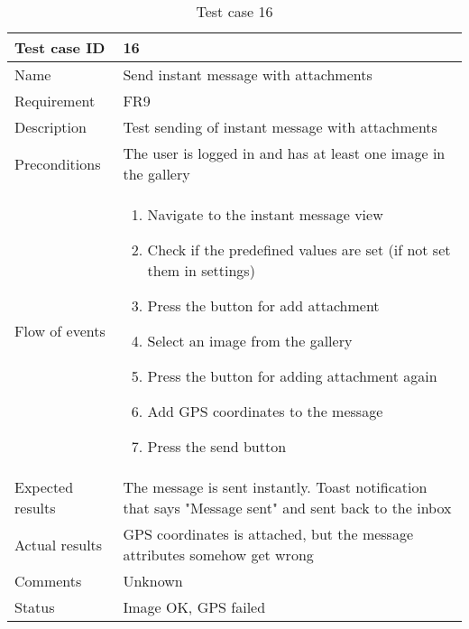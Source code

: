 		\begin{table}
			\begin{tabular}{l|p{10cm}}
				Test case ID & 16 \\ \hline
				Name & Send instant message with attachments\\ \hline
				Requirement & FR9\\ \hline
				Description & Test sending of instant message with attachments\\ \hline
				Preconditions & The user is logged in and has at least one image in the gallery\\ \hline
				Flow of events & 
					\begin{enumerate}
						\item{}Navigate to the instant message view
						\item{}Check if the predefined values are set (if not set them in settings)
						\item{}Press the button for add attachment
						\item{}Select an image from the gallery
						\item{}Press the button for adding attachment again	
						\item{}Add GPS coordinates to the message
						\item{}Press the send button
					\end{enumerate} \\ \hline
				Expected results & The message is sent instantly.  Toast notification that says "Message sent" and sent 							back to the inbox\\ \hline
				Actual results &GPS coordinates is attached, but the message attributes somehow get wrong\\ \hline
				Comments &Unknown\\ \hline
				Status &Image OK, GPS failed\\ \hline
			\end{tabular}
			\caption{Test case 16} \label{tab:case16}
		\end{table}

